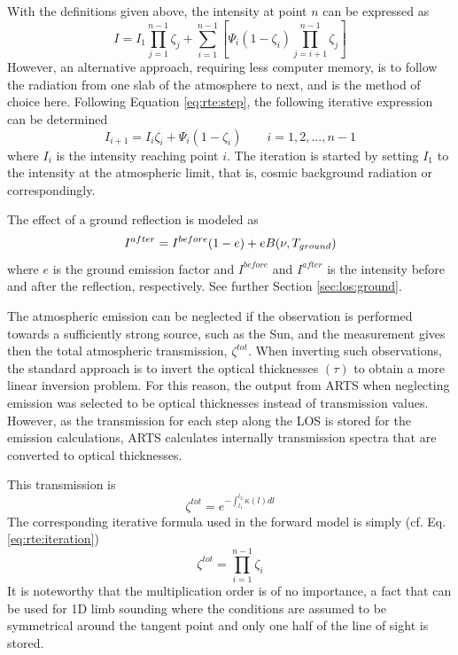   \label{sec:rte:solving}
  
  With the definitions given above, the intensity at point $n$ can be
  expressed as
 \begin{equation}
   I = I_1 \prod_{j=1}^{n-1}\zeta_j + 
       \sum_{i=1}^{n-1}\left[\Psi_i(1-\zeta_i)\prod_{j=i+1}^{n-1}\zeta_j\right]
  \label{eq:rte:rteprod}
 \end{equation}
 However, an alternative approach, requiring less computer memory, is
 to follow the radiation from one slab of the atmosphere to next, and
 is the method of choice here. Following Equation \ref{eq:rte:step},
 the following iterative expression can be determined
 \citep{eriksson:97a}
 \begin{equation}
   I_{i+1} = I_i\zeta_i + \Psi_i\left(1-\zeta_i\right)\qquad i=1,2,...,n-1
  \label{eq:rte:iteration}
 \end{equation}
 where $I_i$ is the intensity reaching point $i$.
 The iteration is started by setting $I_1$ to the intensity at the 
 atmospheric limit, that is, cosmic background radiation or correspondingly.


  \label{sec:rte:ground}

 The effect of a ground reflection is modeled as
 \begin{equation}
   I^{after} = I^{before}(1-e) + eB(\nu,T_{ground})
  \label{eq:rte:ground}
 \end{equation} 
 where $e$ is the ground emission factor and $I^{before}$ and
 $I^{after}$ is the intensity before and after the reflection,
 respectively. See further Section \ref{sec:los:ground}.


 \label{sec:rte:trans}
  
 The atmospheric emission can be neglected if the observation is
 performed towards a sufficiently strong source, such as the Sun, and
 the measurement gives then the total atmospheric transmission,
 $\zeta^{tot}$. When inverting such observations, the standard
 approach is to invert the optical thicknesses $(\tau)$ to obtain a
 more linear inversion problem. For this reason, the output from ARTS
 when neglecting emission was selected to be optical thicknesses
 instead of transmission values. However, as the transmission for each
 step along the LOS is stored for the emission calculations, ARTS
 calculates internally transmission spectra that are converted to
 optical thicknesses.

 This transmission is
 \begin{equation}
   \zeta^{tot} = e^{-\int_{l_1}^{l_2}{\kappa(l)dl}}
  \label{eq:rte:tottrans}
 \end{equation}
 The corresponding iterative formula used in the forward model is
 simply (cf. Eq. \ref{eq:rte:iteration})
 \begin{equation}
   \zeta^{tot} = \prod_{i=1}^{n-1}\zeta_{i}
 \end{equation} 
 It is noteworthy that the multiplication order
 is of no importance, a fact that can be used for 1D limb sounding where
 the conditions are assumed to be symmetrical around the tangent point and
 only one half of the line of sight is stored. 

